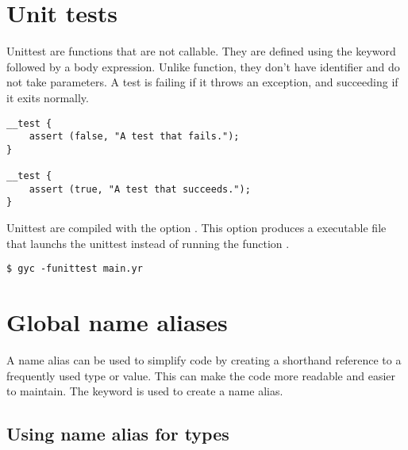 
\vfill%
\pagebreak

\section{Unit tests}%
\label{sec:unit_test}

Unittest are functions that are not callable. They are defined using the keyword
 followed by a body expression. Unlike function, they don't
have identifier and do not take parameters. A test is failing if it throws an
exception, and succeeding if it exits normally.

\begin{lstlisting}[style=coloredverbatim]
__test {
    assert (false, "A test that fails.");
}

__test {
    assert (true, "A test that succeeds.");
}
\end{lstlisting}


Unittest are compiled with the option . This option produces
a executable file that launchs the unittest instead of running the function
.

\begin{lstlisting}[style=intermediateVerb]
$ gyc -funittest main.yr
\end{lstlisting}

\vfill%
\pagebreak

\section{Global name aliases}
\label{sec:global_alias_names}

A name alias can be used to simplify code by creating a shorthand reference to a
frequently used type or value. This can make the code more readable and easier
to maintain. The keyword  is used to create a name alias.

\subsection {Using name alias for types}

